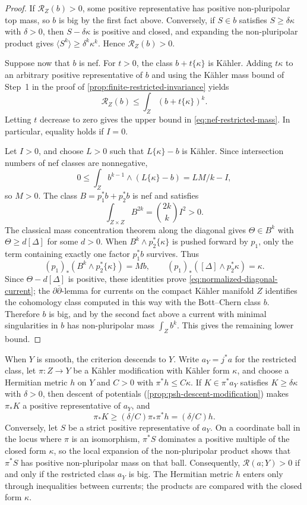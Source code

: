 \begin{proof}
If $\mathcal R_Z(b)>0$, some positive representative has positive non-pluripolar top mass, so $b$ is big by the first fact above. Conversely, if $S\in b$ satisfies $S\geq\delta\kappa$ with $\delta>0$, then $S-\delta\kappa$ is positive and closed, and expanding the non-pluripolar product gives $\langle S^k\rangle\geq\delta^k\kappa^k$. Hence $\mathcal R_Z(b)>0$.

Suppose now that $b$ is nef. For $t>0$, the class $b+t\{\kappa\}$ is K\"ahler. Adding $t\kappa$ to an arbitrary positive representative of $b$ and using the K\"ahler mass bound of Step~1 in the proof of \cref{prop:finite-restricted-invariance} yields
\[
 \mathcal R_Z(b)\leq\int_Z(b+t\{\kappa\})^k.
\]
Letting $t$ decrease to zero gives the upper bound in \eqref{eq:nef-restricted-mass}. In particular, equality holds if $I=0$.

Let $I>0$, and choose $L>0$ such that $L\{\kappa\}-b$ is K\"ahler. Since intersection numbers of nef classes are nonnegative,
\[
 0\leq\int_Zb^{k-1}\wedge(L\{\kappa\}-b)
      =LM/k-I,
\]
so $M>0$. The class $B=p_1^*b+p_2^*b$ is nef and satisfies
\[
 \int_{Z\times Z}B^{2k}={2k\choose k}I^2>0.
\]
The classical mass concentration theorem along the diagonal gives $\Theta\in B^k$ with $\Theta\geq d[\Delta]$ for some $d>0$. When $B^k\wedge p_2^*\{\kappa\}$ is pushed forward by $p_1$, only the term containing exactly one factor $p_1^*b$ survives. Thus
\[
 (p_1)_*(B^k\wedge p_2^*\{\kappa\})=Mb,
 \qquad
 (p_1)_*([\Delta]\wedge p_2^*\kappa)=\kappa.
\]
Since $\Theta-d[\Delta]$ is positive, these identities prove \eqref{eq:normalized-diagonal-current}; the $\partial\bar\partial$-lemma for currents on the compact K\"ahler manifold $Z$ identifies the cohomology class computed in this way with the Bott--Chern class $b$. Therefore $b$ is big, and by the second fact above a current with minimal singularities in $b$ has non-pluripolar mass $\int_Zb^k$. This gives the remaining lower bound.
\end{proof}

When $Y$ is smooth, the criterion descends to $Y$. Write $a_Y=j^*a$ for the restricted class, let $\pi\colon Z\to Y$ be a K\"ahler modification with K\"ahler form $\kappa$, and choose a Hermitian metric $h$ on $Y$ and $C>0$ with $\pi^*h\leq C\kappa$. If $K\in\pi^*a_Y$ satisfies $K\geq\delta\kappa$ with $\delta>0$, then descent of potentials (\cref{prop:psh-descent-modification}) makes $\pi_*K$ a positive representative of $a_Y$, and
\begin{equation}\label{eq:strict-current-pushforward}
 \pi_*K\geq(\delta/C)\pi_*\pi^*h=(\delta/C)h.
\end{equation}
Conversely, let $S$ be a strict positive representative of $a_Y$. On a coordinate ball in the locus where $\pi$ is an isomorphism, $\pi^*S$ dominates a positive multiple of the closed form $\kappa$, so the local expansion of the non-pluripolar product shows that $\pi^*S$ has positive non-pluripolar mass on that ball. Consequently, $\mathcal R(a;Y)>0$ if and only if the restricted class $a_Y$ is big. The Hermitian metric $h$ enters only through inequalities between currents; the products are compared with the closed form $\kappa$.

